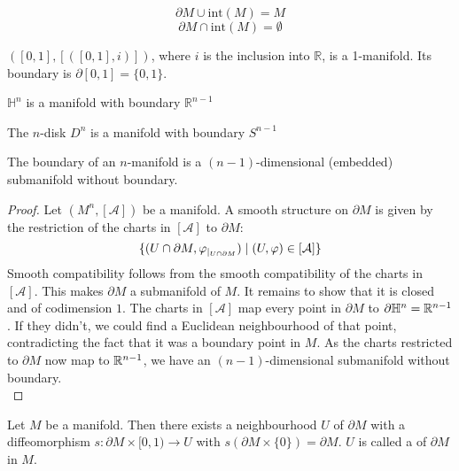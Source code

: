 \documentclass[a4paper,11pt]{article}
\begin{document}
\begin{observation}
    \[\partial M\cup\mathrm{int}(M)=M\]
    \[\partial M\cap \mathrm{int}(M)=\emptyset\]
\end{observation}

\begin{example}
    \(([0,1],[([0,1],i)])\), where \(i\) is the inclusion into \(\mathbb{R}\), is a 1-manifold. Its boundary is \(\partial [0,1]=\{0,1\}\).
\end{example}

\begin{example}
    \(\mathbb{H}^n\) is a manifold with boundary \(\mathbb{R}^{n-1}\)
\end{example}

\begin{example}
    The \(n\)-disk \(D^n\) is a manifold with boundary \(S^{n-1}\)
\end{example}

\begin{theorem}\label{boundary manifold}
    The boundary of an \(n\)-manifold is a \((n-1)\)-dimensional (embedded) submanifold without boundary.
\end{theorem}

\begin{proof}
    Let \((M^n,[\mathcal{A}])\) be a manifold. A smooth structure on \(\partial M\) is given by the restriction of the charts in \([\mathcal{A}]\) to \(\partial M\): \[\{(U\cap\partial M,\varphi_{|_{U\cap\partial M}})\mid (U,\varphi)\in[\mathcal{A}]\}\]
    Smooth compatibility follows from the smooth compatibility of the charts in \([\mathcal{A}]\). This makes \(\partial M\) a submanifold of \(M\). It remains to show that it is closed and of codimension \(1\). The charts in \([\mathcal{A}]\) map every point in \(\partial M\) to \(\partial\mathbb{H}^n=\mathbb{R}^{n-1}\). If they didn't, we could find a Euclidean neighbourhood of that point, contradicting the fact that it was a boundary point in \(M\). As the charts restricted to \(\partial M\) now map to \(\mathbb{R}^{n-1}\), we have an \((n-1)\)-dimensional submanifold without boundary.\\
\end{proof}

\begin{theorem}\label{collar}
    Let \(M\) be a manifold. Then there exists a neighbourhood \(U\) of \(\partial M\) with a diffeomorphism \(s:\partial M\times [0,1)\to U\) with \(s(\partial M\times\{0\})=\partial M\). \(U\) is called a  of \(\partial M\) in \(M\).
\end{theorem}
\end{document}
